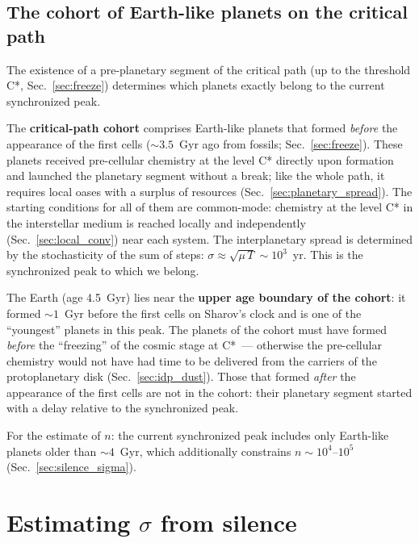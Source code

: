 \documentclass[11pt,a4paper]{article}
\begin{document}
\subsection{The cohort of Earth-like planets on the critical path}
\label{sec:bimodal}

The existence of a pre-planetary segment of the critical path (up to the threshold C*, Sec.~\ref{sec:freeze}) determines which planets exactly belong to the current synchronized peak.

The \textbf{critical-path cohort} comprises Earth-like planets that formed \emph{before} the appearance of the first cells ($\sim 3.5$~Gyr ago from fossils; Sec.~\ref{sec:freeze}). These planets received pre-cellular chemistry at the level C* directly upon formation and launched the planetary segment without a break; like the whole path, it requires local oases with a surplus of resources (Sec.~\ref{sec:planetary_spread}). The starting conditions for all of them are common-mode: chemistry at the level C* in the interstellar medium is reached locally and independently (Sec.~\ref{sec:local_conv}) near each system. The interplanetary spread is determined by the stochasticity of the sum of steps: $\sigma \approx \sqrt{\mu\,T} \sim 10^3$~yr. This is the synchronized peak to which we belong.

The Earth (age 4.5~Gyr) lies near the \textbf{upper age boundary of the cohort}: it formed $\sim 1$~Gyr before the first cells on Sharov's clock and is one of the ``youngest'' planets in this peak. The planets of the cohort must have formed \emph{before} the ``freezing'' of the cosmic stage at C*~--- otherwise the pre-cellular chemistry would not have had time to be delivered from the carriers of the protoplanetary disk (Sec.~\ref{sec:idp_dust}). Those that formed \emph{after} the appearance of the first cells are not in the cohort: their planetary segment started with a delay relative to the synchronized peak.

For the estimate of $n$: the current synchronized peak includes only Earth-like planets older than $\sim 4$~Gyr, which additionally constrains $n \sim 10^4$--$10^5$ (Sec.~\ref{sec:silence_sigma}).

\section{Estimating \texorpdfstring{$\sigma$}{σ} from silence}
\label{sec:inversion}
\end{document}

